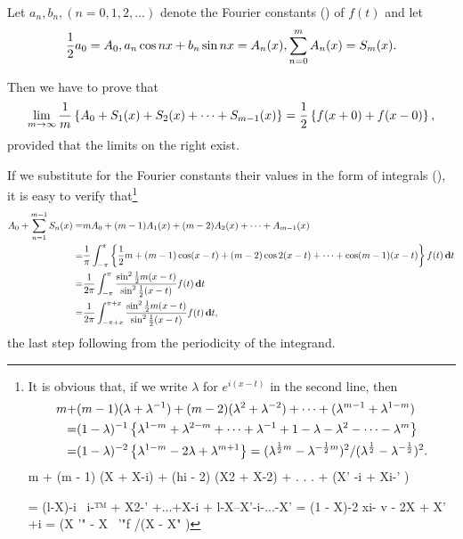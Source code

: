 Let $a_{n}, b_{n}, (n=0,1,2,\ldots)$ denote the Fourier constants
() of
$f(t)$ and let
$$
\half a_{0} = A_{0},
\hfill
a_{n} \cos n x + b_{n} \sin n x = A_{n}(x),
\hfill
\sum_{n=0}^{m} A_{n}(x) = S_{m}(x).
$$

Then we have to prove that
$$
\lim_{m \rightarrow \infty}
\frac{1}{m} \left\{ 
  A_{0}
  + S_{1}(x) + S_{2}(x) + \cdots + S_{m-1}(x)
 \right\}
=
\frac{1}{2} \left\{ 
  f(x+0) + f(x-0)
 \right\},
$$
provided that the limits on the right exist.

If we substitute for the Fourier constants their values in the form of
integrals (), it is easy to verify
that\footnote{It is obvious that, if we write $\lambda$ for $e^{i(x-t)}$ in the second line,
  then
  \begin{align*}
    m + &
    (m-1) (\lambda + \lambda^{-1})
    + (m-2) (\lambda^{2} + \lambda^{-2})
    + \cdots
    + (\lambda^{m-1} + \lambda^{1 - m})
    \\
    =&
    (1 - \lambda)^{-1} \left\{ 
      \lambda^{1-m}
      + \lambda^{2-m}
      + \cdots
      + \lambda^{-1}
      + 1
      - \lambda
      - \lambda^{2}
      - \cdots
      - \lambda^{m}
     \right\} \\
    =&
    (1 - \lambda)^{-2} \left\{ 
      \lambda^{1 - m}
      - 2 \lambda
      + \lambda^{m+1}
     \right\}
    =
    (\lambda^{\frac{1}{2} m} - \lambda^{-\frac{1}{2} m})^{2}
    /
    (\lambda^{\frac{1}{2}} - \lambda^{-\frac{1}{2}})^{2}.
  \end{align*}
  m + (m - 1) (X + X-i) + (hi - 2) (X2 + X-2) + . . . + (X' -i + Xi-' )

  = (l-X)-i \ i-™ + X2-' +...+X-i + l-X--X'-i-...-X' = (1 - X)-2 xi- v -
  2X + X' +i = (X '" - X~ '"f /(X - X" )
}
\begin{align*}
  A_{0} + \sum_{n=1}^{m-1} S_{n}(x)
  =&
  m A_{0}
  + (m - 1) A_{1}(x)
  + (m - 2) A_{2}(x)
  + \cdots
  + A_{m-1}(x)
  \\
  =&
  \frac{1}{\pi}
  \int_{-\pi}^{\pi} \left\{ 
    \frac{1}{2} m
    + (m-1) \cos (x-t)
    + (m-2) \cos 2(x-t)
    + \cdots
    + \cos (m-1)(x-t)
   \right\}
  f(t) \, \mathbf{d} t
  \\
  =&
  \frac{1}{2\pi}
  \int_{-\pi}^{\pi}
  \frac{\sin^{2} \frac{1}{2} m (x-t)}{\sin^{2} \frac{1}{2} (x-t)}
  f(t) \, \mathbf{d} t
  \\
  =&
  \frac{1}{2\pi}
  \int_{-\pi+x}^{\pi+x}
  \frac{\sin^{2} \frac{1}{2} m (x-t)}{\sin^{2} \frac{1}{2} (x-t)}
  f(t) \, \mathbf{d} t,
\end{align*}
the last step following from the periodicity
of the integrand.

